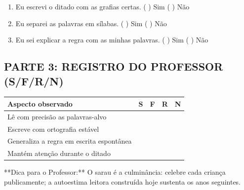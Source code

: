 \begin{exercicio}
\begin{enumerate}[label=\alph*)]
  \item Eu escrevi o ditado com as grafias certas.  \quad ( ) Sim   ( ) Não

  \item Eu separei as palavras em sílabas.  \quad ( ) Sim   ( ) Não

  \item Eu sei explicar a regra com as minhas palavras.  \quad ( ) Sim   ( ) Não

\end{enumerate}

\subsection*{PARTE 3: REGISTRO DO PROFESSOR (S/F/R/N)}

\begin{center}
\renewcommand{\arraystretch}{1.4}
\begin{tabular}{@{}p{9cm}cccc@{}}
\toprule
Aspecto observado & S & F & R & N \\
\midrule
Lê com precisão as palavras-alvo & & & & \\
Escreve com ortografia estável & & & & \\
Generaliza a regra em escrita espontânea & & & & \\
Mantém atenção durante o ditado & & & & \\
\bottomrule\end{tabular}\end{center}

\end{exercicio}

\begin{dica}
**Dica para o Professor:** O sarau é a culminância: celebre cada criança publicamente; a autoestima leitora construída hoje sustenta os anos seguintes.
\end{dica}


